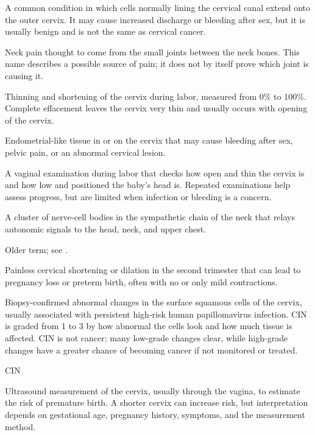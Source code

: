  A common condition in which cells normally lining the cervical canal extend onto the outer cervix. It may cause increased discharge or bleeding after sex, but it is usually benign and is not the same as cervical cancer.

 Neck pain thought to come from the small joints between the neck bones. This name describes a possible source of pain; it does not by itself prove which joint is causing it.

 Thinning and shortening of the cervix during labor, measured from 0\% to 100\%. Complete effacement leaves the cervix very thin and usually occurs with opening of the cervix.

 Endometrial-like tissue in or on the cervix that may cause bleeding after sex, pelvic pain, or an abnormal cervical lesion.

 A vaginal examination during labor that checks how open and thin the cervix is and how low and positioned the baby's head is. Repeated examinations help assess progress, but are limited when infection or bleeding is a concern.

 A cluster of nerve-cell bodies in the sympathetic chain of the neck that relays autonomic signals to the head, neck, and upper chest.

 Older term; see .

 Painless cervical shortening or dilation in the second trimester that can lead to pregnancy loss or preterm birth, often with no or only mild contractions.

 Biopsy-confirmed abnormal changes in the surface squamous cells of the cervix, usually associated with persistent high-risk human papillomavirus infection. CIN is graded from 1 to 3 by how abnormal the cells look and how much tissue is affected. CIN is not cancer; many low-grade changes clear, while high-grade changes have a greater chance of becoming cancer if not monitored or treated.

\synonyms
CIN

 Ultrasound measurement of the cervix, usually through the vagina, to estimate the risk of premature birth. A shorter cervix can increase risk, but interpretation depends on gestational age, pregnancy history, symptoms, and the measurement method.

